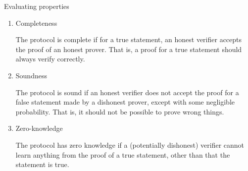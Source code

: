\documentclass{practice}
\begin{document}
\begin{task}{Evaluating properties}
  \begin{enumerate}
    \item Completeness
    
    The protocol is complete if for a true statement, an honest verifier accepts the proof of an honest prover.
    That is, a proof for a true statement should always verify correctly.
    \item Soundness
    
    The protocol is sound if an honest verifier does not accept the proof for a false statement made by a dishonest prover, except with some negligible probability.
    That is, it should not be possible to prove wrong things.
    \item Zero-knowledge
    
    The protocol has zero knowledge if a (potentially dishonest) verifier cannot learn anything from the proof of a true statement, other than that the statement is true.
  \end{enumerate}
\end{task}
\end{document}
